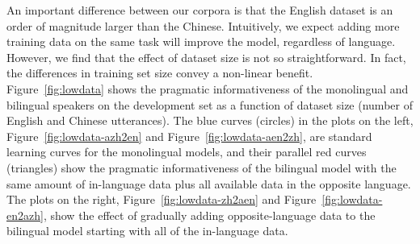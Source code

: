 \documentclass[11pt,a4paper]{article}
\renewcommand{\|}{\mid}
\newcommand{\figref}[1]{Figure~\ref{#1}}
\newcommand{\Figref}[1]{Figure~\ref{#1}}
\begin{document}
An important difference between our corpora is that the English dataset is an order of magnitude larger than the Chinese. Intuitively, we expect adding more training data on the same task will
improve the model, regardless of language. However, we find that the effect of dataset size is not so straightforward. In fact, the differences in training set size convey a non-linear benefit.
\Figref{fig:lowdata} shows the pragmatic informativeness of the monolingual and bilingual speakers on the development set
as a function of dataset size (number of English and Chinese utterances). The blue curves (circles) in the plots on the left, 
\figref{fig:lowdata-azh2en} and \figref{fig:lowdata-aen2zh}, are standard learning curves for the monolingual 
models, and their parallel red curves (triangles) show the pragmatic informativeness of the bilingual model with the
same amount of in-language data plus all available data in the opposite language. The plots on the right, 
\figref{fig:lowdata-zh2aen} and \figref{fig:lowdata-en2azh}, show the effect of gradually adding 
opposite-language data to the bilingual model starting with all of the in-language data.
\end{document}
